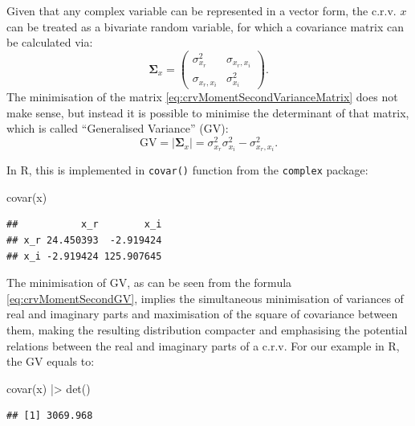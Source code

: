 \documentclass[
]{book}
\newenvironment{Shaded}{\begin{snugshade}}{\end{snugshade}}
\newcommand{\FunctionTok}[1]{\textcolor[rgb]{0.00,0.00,0.00}{#1}}
\newcommand{\NormalTok}[1]{#1}
\newcommand{\SpecialCharTok}[1]{\textcolor[rgb]{0.00,0.00,0.00}{#1}}
\begin{document}
Given that any complex variable can be represented in a vector form, the c.r.v. \(x\) can be treated as a bivariate random variable, for which a covariance matrix can be calculated via:
\begin{equation}
    \boldsymbol{\Sigma}_x = \begin{pmatrix} \sigma_{x_r}^2 & \sigma_{x_r, x_i} \\ \sigma_{x_r, x_i} & \sigma_{x_i}^2 \end{pmatrix} .
    \label{eq:crvMomentSecondVarianceMatrix}
\end{equation}
The minimisation of the matrix \eqref{eq:crvMomentSecondVarianceMatrix} does not make sense, but instead it is possible to minimise the determinant of that matrix, which is called ``Generalised Variance'' (GV):
\begin{equation}
    \mathrm{GV} = |\boldsymbol{\Sigma}_x| = \sigma_{x_r}^2 \sigma_{x_i}^2 - \sigma_{x_r, x_i}^2 .
    \label{eq:crvMomentSecondGV}
\end{equation}

In R, this is implemented in \texttt{covar()} function from the \texttt{complex} package:

\begin{Shaded}
\begin{Highlighting}[]
\FunctionTok{covar}\NormalTok{(x)}
\end{Highlighting}
\end{Shaded}

\begin{verbatim}
##           x_r        x_i
## x_r 24.450393  -2.919424
## x_i -2.919424 125.907645
\end{verbatim}

The minimisation of GV, as can be seen from the formula \eqref{eq:crvMomentSecondGV}, implies the simultaneous minimisation of variances of real and imaginary parts and maximisation of the square of covariance between them, making the resulting distribution compacter and emphasising the potential relations between the real and imaginary parts of a c.r.v. For our example in R, the GV equals to:

\begin{Shaded}
\begin{Highlighting}[]
\FunctionTok{covar}\NormalTok{(x) }\SpecialCharTok{|\textgreater{}} \FunctionTok{det}\NormalTok{()}
\end{Highlighting}
\end{Shaded}

\begin{verbatim}
## [1] 3069.968
\end{verbatim}
\end{document}
